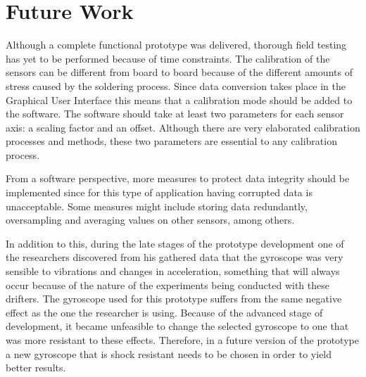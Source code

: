 \section{Future Work}
\label{sec:futureWork}
Although a complete functional prototype was delivered, thorough field testing has yet to be performed because of time constraints.   The calibration of the sensors can be different from board to board because of the different amounts of stress caused by the soldering process.  Since data conversion takes place in the Graphical User Interface this means that a calibration mode should be added to the software.  The software should take at least two parameters for each sensor axis: a scaling factor and an offset.  Although there are very elaborated calibration processes and methods, these two parameters are essential to any calibration process. 

From a software perspective, more measures to protect data integrity should be implemented since for this type of application having corrupted data is unacceptable.  Some measures might include storing data redundantly, oversampling and averaging values on other sensors, among others.

In addition to this, during the late stages of the prototype development one of the researchers discovered from his gathered data that the gyroscope was very sensible to vibrations and changes in acceleration, something that will always occur because of the nature of the experiments being conducted with these drifters.  The gyroscope used for this prototype suffers from the same negative effect as the one the researcher is using.  Because of the advanced stage of development, it became unfeasible to change the selected gyroscope to one that was more resistant to these effects. Therefore, in a future version of the prototype a new gyroscope that is shock resistant needs to be chosen in order to yield better results.
